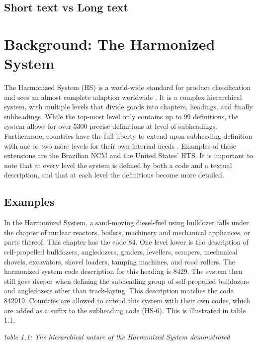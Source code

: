 \subsection{Short text vs Long text}


\section{Background: The Harmonized System}
The Harmonized System (HS) is a world-wide standard for product classification and sees an almost complete adaption worldwide \cite{article}. It is a complex hierarchical system, with multiple levels that divide goods into chapters, headings, and finally subheadings. While the top-most level only contains up to 99 definitions, the system allows for over 5300 precise definitions at level of subheadings. Furthermore, countries have the full liberty to extend upon subheading definition with one or two more levels for their own internal needs \cite{article}. Examples of these extensions are the Brazilian NCM and the United States’ HTS. It is important to note that at every level the system is defined by both a code and a textual description, and that at each level the definitions become more detailed.

\subsection{Examples}
In the Harmonized System, a sand-moving diesel-fuel using bulldozer falls under the chapter of nuclear reactors, boilers, machinery and mechanical appliances, or parts thereof. This chapter has the code 84. One level lower is the description of self-propelled bulldozers, angledozers, graders, levellers, scrapers, mechanical shovels, excavators, shovel loaders, tamping machines, and road rollers. The harmonized system code description for this heading is 8429. The system then still goes deeper when defining the subheading group of self-propelled bulldozers and angledozers other than track-laying. This description matches the code 842919. Countries are allowed to extend this system with their own codes, which are added as a suffix to the subheading code (HS-6). This is illustrated in table 1.1.

\begin{center}
    
\end{center}
{\textit{table 1.1: The hierarchical nature of the Harmonized System demonstrated}} \\

